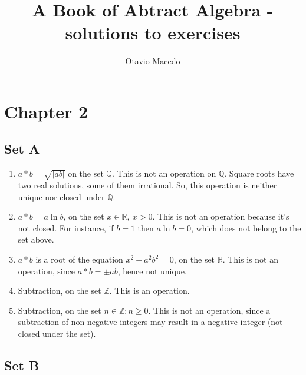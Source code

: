 \documentclass{article}
\author{Otavio Macedo}
\title{A Book of Abtract Algebra - solutions to exercises}
\begin{document}
\maketitle

\section*{Chapter 2}
\subsection*{Set A}
\begin{enumerate}
\item $a * b = \sqrt{|ab|}$ on the set $\mathbb{Q}$. This is not an operation on $\mathbb{Q}$. Square roots have two real solutions, some of them irrational. So, this operation is neither unique nor closed under $\mathbb{Q}$.

\item $a * b = a \ln b$, on the set ${x \in \mathbb{R}},\ x > 0$. This is not an operation because it's not closed. For instance, if $b = 1$ then $a\ln b = 0$, which does not belong to the set above.

\item $a * b$ is a root of the equation $x^2 - a^2b^2 = 0$, on the set $\mathbb{R}$. This is not an operation, since $a * b = \pm ab$, hence not unique.

\item Subtraction, on the set $\mathbb{Z}$. This is an operation.

\item Subtraction, on the set ${n \in \mathbb{Z} : n \geq 0}$. This is not an operation, since a subtraction of non-negative integers may result in a negative integer (not closed under the set).

\end{enumerate}

\subsection*{Set B}
\end{document}
